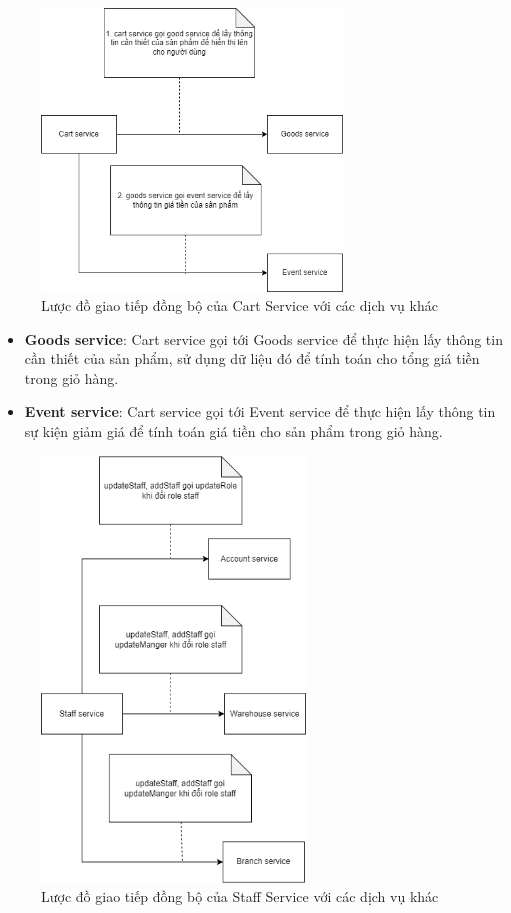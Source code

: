 \begin{figure}[!htp]
	\centering
	\includegraphics[width=8cm]{img/Architecture/service/cart-call.png}
	\newline
	\caption{Lược đồ giao tiếp đồng bộ của Cart Service với các dịch vụ khác}
\end{figure}

\begin{itemize}
	\item \textbf{Goods service}: Cart service gọi tới Goods service để thực hiện lấy thông tin cần thiết của sản phẩm, sử dụng dữ liệu đó để tính toán cho tổng giá tiền trong giỏ hàng.
	\item \textbf{Event service}: Cart service gọi tới Event service để thực hiện lấy thông tin sự kiện giảm giá để tính toán giá tiền cho sản phẩm trong giỏ hàng.
\end{itemize}

\newpage
{}
\begin{figure}[!htp]
	\centering
	\includegraphics[width=7cm]{img/Architecture/service/staff-call.png}
	\newline
	\caption{Lược đồ giao tiếp đồng bộ của Staff Service với các dịch vụ khác}
\end{figure}

